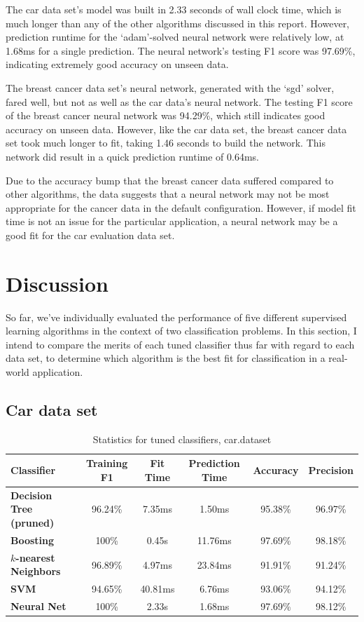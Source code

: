 \documentclass{article}
\begin{document}
    The car data set's model was built in 2.33 seconds of wall clock time, which is much longer than any of the other algorithms discussed in this report. However, prediction runtime for the `adam'-solved neural network were relatively low, at 1.68ms for a single prediction. The neural network's testing F1 score was 97.69\%, indicating extremely good accuracy on unseen data.

    The breast cancer data set's neural network, generated with the `sgd' solver, fared well, but not as well as the car data's neural network. The testing F1 score of the breast cancer neural network was 94.29\%, which still indicates good accuracy on unseen data. However, like the car data set, the breast cancer data set took much longer to fit, taking 1.46 seconds to build the network. This network did result in a quick prediction runtime of 0.64ms.

    Due to the accuracy bump that the breast cancer data suffered compared to other algorithms, the data suggests that a neural network may not be most appropriate for the cancer data in the default configuration. However, if model fit time is not an issue for the particular application, a neural network may be a good fit for the car evaluation data set.

    \section{Discussion}
    So far, we've individually evaluated the performance of five different supervised learning algorithms in the context of two classification problems. In this section, I intend to compare the merits of each tuned classifier thus far with regard to each data set, to determine which algorithm is the best fit for classification in a real-world application.

    \subsection{Car data set}

    \begin{table}[h!]
    \centering
    \begin{tabular}{||l c c c c c||} 
     \hline
     \textbf{Classifier} & Training F1 & Fit Time & Prediction Time & Accuracy & Precision \\
     \hline
     \textbf{Decision Tree (pruned)} & 96.24\% & 7.35ms & 1.50ms & 95.38\% & 96.97\% \\ 
     \textbf{Boosting} & 100\% & 0.45s & 11.76ms & 97.69\% & 98.18\% \\
     \textbf{$k$-nearest Neighbors} & 96.89\% & 4.97ms & 23.84ms & 91.91\% & 91.24\% \\
     \textbf{SVM} & 94.65\% & 40.81ms & 6.76ms & 93.06\% & 94.12\% \\
     \textbf{Neural Net} & 100\% & 2.33s & 1.68ms & 97.69\% & 98.12\% \\
     \hline
    \end{tabular}
    \caption{Statistics for tuned classifiers, car.dataset}
    \label{tab:car-stats}
    \end{table}
\end{document}
